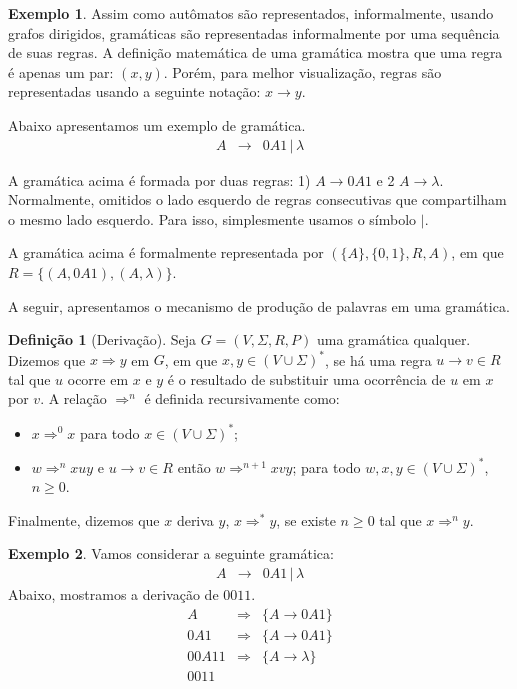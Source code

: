\documentclass[a4paper]{article}
\theoremstyle{definition}
\newtheorem{Example}{Exemplo}
\newtheorem{Definition}{Definição}
\begin{document}
  \begin{Example}
    Assim como autômatos são representados, informalmente, usando grafos
    dirigidos, gramáticas são representadas informalmente por uma sequência
    de suas regras. A definição matemática de uma gramática mostra que uma
    regra é apenas um par: $(x,y)$. Porém, para melhor visualização, regras
    são representadas usando a seguinte notação: $x \to y$.

    Abaixo apresentamos um exemplo de gramática.
    \[
      \begin{array}{lcl}
        A & \to & 0A1 \,|\, \lambda
      \end{array}
    \]

    A gramática acima é formada por duas regras: 1) $A \to 0A1$ e 2 $A \to
    \lambda$. Normalmente, omitidos o lado esquerdo de regras consecutivas
    que compartilham o mesmo lado esquerdo. Para isso, simplesmente usamos
    o símbolo $|$.

    A gramática acima é formalmente representada por $(\{A\},\{0,1\},R,A)$, em
    que $R =\{(A,0A1),(A,\lambda)\}$.

    A seguir, apresentamos o mecanismo de produção de palavras
    em uma gramática.
  \end{Example}

  \begin{Definition}[Derivação]
    Seja $G = (V,\Sigma,R,P)$ uma gramática qualquer.
    Dizemos que $x \Rightarrow
    y$ em $G$, em que $x,y \in (V\cup \Sigma)^*$, se  há uma regra $u \to v \in
    R$ tal que $u$ ocorre em $x$ e $y$ é o resultado de substituir uma
    ocorrência de $u$ em $x$ por $v$. A relação $\Rightarrow^n$ é definida 
    recursivamente como:
    \begin{itemize}
      \item $x \Rightarrow^0 x$ para todo $x \in (V \cup \Sigma)^*$;
      \item $w \Rightarrow^n x u y$ e $u \to v \in R$ então $w \Rightarrow^{n +
          1}x v y$; para todo $w,x,y \in (V\cup \Sigma)^*$, $n\geq 0$.
    \end{itemize}
    Finalmente, dizemos que $x$ deriva $y$, $x\Rightarrow^*y$, se existe 
    $n\geq 0$ tal que $x\Rightarrow^n y$.
  \end{Definition}

  \begin{Example}
    Vamos considerar a seguinte gramática:
    \[
      \begin{array}{lcl}
        A & \to & 0A1 \,|\, \lambda
      \end{array}
    \]
    Abaixo, mostramos a derivação de $0011$.
    \[
      \begin{array}{lcl}
        A   & \Rightarrow & \{A \to 0A1\}\\
        0A1 & \Rightarrow & \{A \to 0A1\}\\
        00A11 & \Rightarrow & \{A \to \lambda\} \\
        0011
      \end{array}
    \]
  \end{Example}
\end{document}

